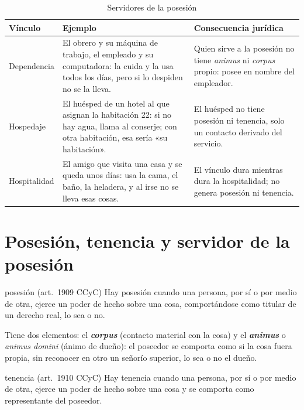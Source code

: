 \documentclass[12pt,oneside]{book}
\begin{document}
\begin{table}[H]
\centering
\small
\begin{tabularx}{\textwidth}{>{\raggedright\arraybackslash}p{}>{\raggedright\arraybackslash}X>{\raggedright\arraybackslash}X}
\toprule
\textbf{Vínculo} & \textbf{Ejemplo} & \textbf{Consecuencia jurídica} \\
\midrule
Dependencia & El obrero y su máquina de trabajo, el empleado y su computadora: la cuida y la usa todos los días, pero si lo despiden no se la lleva. & Quien sirve a la posesión no tiene \textit{animus} ni \textit{corpus} propio: posee en nombre del empleador. \\
Hospedaje & El huésped de un hotel al que asignan la habitación 22: si no hay agua, llama al conserje; con otra habitación, esa sería «su habitación». & El huésped no tiene posesión ni tenencia, solo un contacto derivado del servicio. \\
Hospitalidad & El amigo que visita una casa y se queda unos días: usa la cama, el baño, la heladera, y al irse no se lleva esas cosas. & El vínculo dura mientras dura la hospitalidad; no genera posesión ni tenencia. \\
\bottomrule
\end{tabularx}
\caption{Servidores de la posesión}
\end{table}

\section{Posesión, tenencia y servidor de la posesión}

\begin{definicion}{posesión (art.~1909 CCyC)}
Hay posesión cuando una persona, por sí o por medio de otra, ejerce un poder de hecho sobre una cosa, comportándose como titular de un derecho real, lo sea o no.
\end{definicion}

Tiene dos elementos: el \textbf{\textit{corpus}} (contacto material con la cosa) y el \textbf{\textit{animus}} o \textit{animus domini} (ánimo de dueño): el poseedor se comporta como si la cosa fuera propia, sin reconocer en otro un señorío superior, lo sea o no el dueño.

\begin{definicion}{tenencia (art.~1910 CCyC)}
Hay tenencia cuando una persona, por sí o por medio de otra, ejerce un poder de hecho sobre una cosa y se comporta como representante del poseedor.
\end{definicion}
\end{document}
